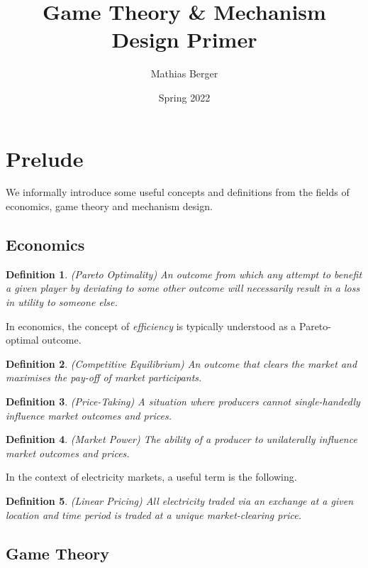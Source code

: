 \documentclass{article}
\title{Game Theory \& Mechanism Design Primer}
\author{Mathias Berger}
\date{Spring 2022}
\newtheorem{definition}{Definition}
\begin{document}
\maketitle

\section{Prelude}

We informally introduce some useful concepts and definitions from the fields of economics, game theory and mechanism design.

\subsection{Economics}

\begin{definition}
(Pareto Optimality) An outcome from which any attempt to benefit a given player by deviating to some other outcome will necessarily result in a loss in utility to someone else.
\end{definition}

In economics, the concept of \textit{efficiency} is typically understood as a Pareto-optimal outcome.

\begin{definition}
(Competitive Equilibrium) An outcome that clears the market and maximises the pay-off of market participants.
\end{definition}

\begin{definition}
(Price-Taking) A situation where producers cannot single-handedly influence market outcomes and prices.
\end{definition}  

\begin{definition}
(Market Power) The ability of a producer to unilaterally influence market outcomes and prices. 
\end{definition}

In the context of electricity markets, a useful term is the following.

\begin{definition}
(Linear Pricing) All electricity traded via an exchange at a given location and time period is traded at a unique market-clearing price.
\end{definition}

\subsection{Game Theory}
\end{document}
